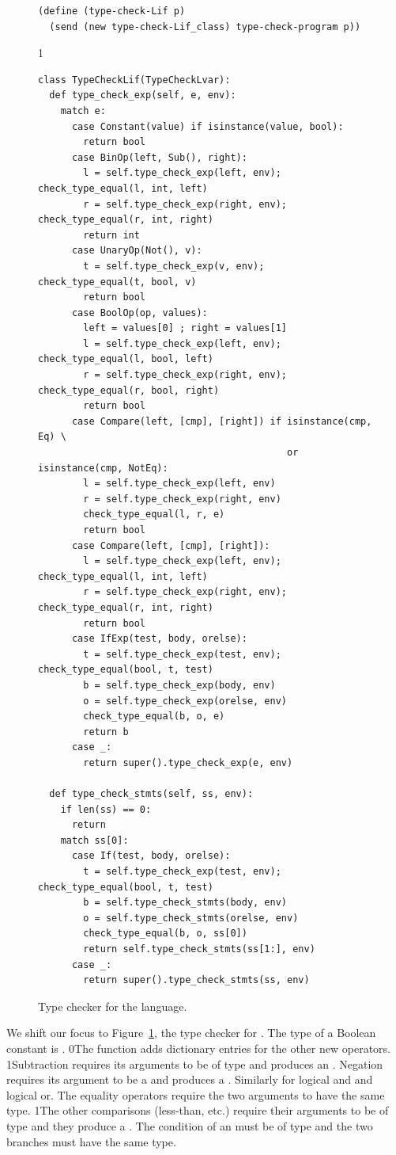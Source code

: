 \documentclass[7x10]{TimesAPriori_MIT}%
\def\racketEd{0}
\def\pythonEd{1}
\def\edition{1}
\newcommand{\racket}[1]{{\if\edition\racketEd{#1}\fi}}
\newcommand{\python}[1]{{\if\edition\pythonEd #1\fi}}
\begin{document}
\begin{figure}[tbp]
{\begin{lstlisting}[basicstyle=\ttfamily\footnotesize]
(define (type-check-Lif p)
  (send (new type-check-Lif_class) type-check-program p))
\end{lstlisting}
\fi}
{\if\edition\pythonEd
\begin{lstlisting}
class TypeCheckLif(TypeCheckLvar):
  def type_check_exp(self, e, env):
    match e:
      case Constant(value) if isinstance(value, bool):
        return bool
      case BinOp(left, Sub(), right):
        l = self.type_check_exp(left, env); check_type_equal(l, int, left)
        r = self.type_check_exp(right, env); check_type_equal(r, int, right)
        return int
      case UnaryOp(Not(), v):
        t = self.type_check_exp(v, env); check_type_equal(t, bool, v)
        return bool 
      case BoolOp(op, values):
        left = values[0] ; right = values[1]
        l = self.type_check_exp(left, env); check_type_equal(l, bool, left)
        r = self.type_check_exp(right, env); check_type_equal(r, bool, right)
        return bool
      case Compare(left, [cmp], [right]) if isinstance(cmp, Eq) \
                                            or isinstance(cmp, NotEq):
        l = self.type_check_exp(left, env)
        r = self.type_check_exp(right, env)
        check_type_equal(l, r, e)
        return bool
      case Compare(left, [cmp], [right]):
        l = self.type_check_exp(left, env); check_type_equal(l, int, left)
        r = self.type_check_exp(right, env); check_type_equal(r, int, right)
        return bool
      case IfExp(test, body, orelse):
        t = self.type_check_exp(test, env); check_type_equal(bool, t, test)
        b = self.type_check_exp(body, env)
        o = self.type_check_exp(orelse, env)
        check_type_equal(b, o, e)
        return b
      case _:
        return super().type_check_exp(e, env)

  def type_check_stmts(self, ss, env):
    if len(ss) == 0:
      return
    match ss[0]:
      case If(test, body, orelse):
        t = self.type_check_exp(test, env); check_type_equal(bool, t, test)
        b = self.type_check_stmts(body, env)
        o = self.type_check_stmts(orelse, env)
        check_type_equal(b, o, ss[0])
        return self.type_check_stmts(ss[1:], env)
      case _:
        return super().type_check_stmts(ss, env)
\end{lstlisting}
\fi}
\caption{Type checker for the \LangIf{} language.}
\label{fig:type-check-Lif}
\end{figure}

We shift our focus to Figure~\ref{fig:type-check-Lif}, the type
checker for \LangIf{}.
%
The type of a Boolean constant is \BOOLTY{}.
%
\racket{The  function adds dictionary entries for
  the other new operators.}
%
\python{Subtraction requires its arguments to be of type \INTTY{} and produces
  an \INTTY{}. Negation requires its argument to be a \BOOLTY{} and
  produces a \BOOLTY{}. Similarly for logical and and logical or. }
%
The equality operators require the two arguments to have the same
type.
%
\python{The other comparisons (less-than, etc.) require their
arguments to be of type \INTTY{} and they produce a \BOOLTY{}.}
%
The condition of an  must
be of \BOOLTY{} type and the two branches must have the same type.
\end{document}

